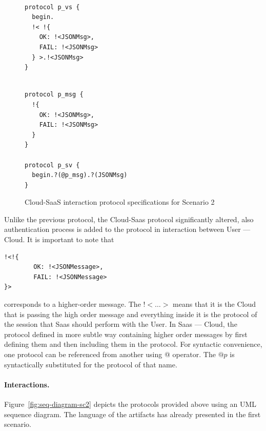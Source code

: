 \documentclass{llncs}
\begin{document}
{
\lstset{
  framerule=0pt,
  numbers=none,
  basicstyle=\ttfamily\scriptsize,
}
\renewcommand\lstlistingname{Protocol}
\setcounter{lstlisting}{0}
\begin{figure}

\begin{minipage}[t]{0.50\textwidth}
\begin{lstlisting}[caption=Cloud]

protocol p_vs {
  begin.
  !< !{
    OK: !<JSONMsg>, 
    FAIL: !<JSONMsg>
  } >.!<JSONMsg>    
}

\end{lstlisting}
\end{minipage}
\begin{minipage}[t]{0.50\textwidth}
\begin{lstlisting}[caption=Cloud]

protocol p_msg { 
  !{
    OK: !<JSONMsg>,
    FAIL: !<JSONMsg> 
  }
}

protocol p_sv {
  begin.?(@p_msg).?(JSONMsg) 
}

\end{lstlisting}
\end{minipage}
\caption{Cloud-SaaS interaction protocol specifications for Scenario 2}\label{fig:cloud-saas-providers} 
\end{figure}

}

Unlike the previous protocol, the Cloud-Saas protocol significantly altered, also authentication process is added to the protocol in interaction between User --- Cloud. It is important to note that 

\begin{lstlisting}
!<!{
        OK: !<JSONMessage>,
        FAIL: !<JSONMessage> 
}>
\end{lstlisting}

corresponds to a higher-order message. The !$<\dots>$ means that it is the Cloud that is passing the high order message and everything inside it is the protocol of the session that Saas should perform with the User. In Saas --- Cloud, the protocol defined in more subtle way containing higher order messages by first defining them and then including them in the protocol. For syntactic convenience, one protocol can be referenced from another using @ operator. The $@p$ is syntactically substituted for the protocol of that name.

\paragraph{Interactions.} Figure~\ref{fig:seq-diagram-sc2} depicts the protocols provided above using an UML sequence diagram. The language of the artifacts has already presented in the first scenario.
\end{document}
